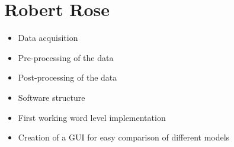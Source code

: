\documentclass[a4paper,11pt,oneside]{article}
\begin{document}
\section*{Robert Rose}

\begin{itemize}
\item Data acquisition
\item Pre-processing of the data
\item Post-processing of the data
\item Software structure
\item First working word level implementation
\item Creation of a GUI for easy comparison of different models
\end{itemize}
  
\end{document}
